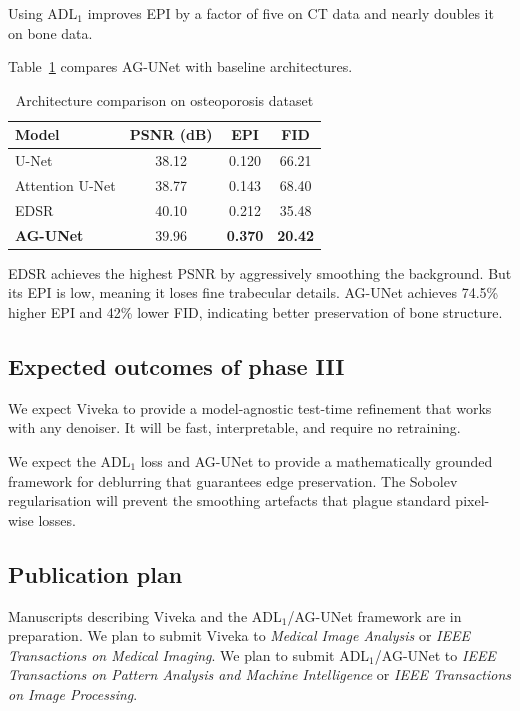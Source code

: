 Using ADL\(_1\) improves EPI by a factor of five on CT data and nearly doubles it on bone data.

Table~\ref{tab:agunet} compares AG-UNet with baseline architectures.

\begin{table}[H]
	\centering
	\caption{Architecture comparison on osteoporosis dataset}
	\label{tab:agunet}
	\begin{tabular}{lccc}
		\toprule
		Model & PSNR (dB) & EPI & FID \\
		\midrule
		U-Net & 38.12 & 0.120 & 66.21 \\
		Attention U-Net & 38.77 & 0.143 & 68.40 \\
		EDSR & 40.10 & 0.212 & 35.48 \\
		\textbf{AG-UNet} & 39.96 & \textbf{0.370} & \textbf{20.42} \\
		\bottomrule
	\end{tabular}
\end{table}

EDSR achieves the highest PSNR by aggressively smoothing the background. But its EPI is low, meaning it loses fine trabecular details. AG-UNet achieves 74.5\% higher EPI and 42\% lower FID, indicating better preservation of bone structure.

\subsection{Expected outcomes of phase III}

We expect Viveka to provide a model-agnostic test-time refinement that works with any denoiser. It will be fast, interpretable, and require no retraining.

We expect the ADL\(_1\) loss and AG-UNet to provide a mathematically grounded framework for deblurring that guarantees edge preservation. The Sobolev regularisation will prevent the smoothing artefacts that plague standard pixel-wise losses.

\subsection{Publication plan}

Manuscripts describing Viveka and the ADL\(_1\)/AG-UNet framework are in preparation. We plan to submit Viveka to \textit{Medical Image Analysis} or \textit{IEEE Transactions on Medical Imaging}. We plan to submit ADL\(_1\)/AG-UNet to \textit{IEEE Transactions on Pattern Analysis and Machine Intelligence} or \textit{IEEE Transactions on Image Processing}.

